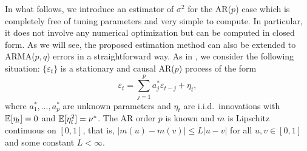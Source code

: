 In what follows, we introduce an estimator of $\sigma^2$ for the AR($p$) case which is completely free of tuning parameters and very simple to compute. In particular, it does not involve any numerical optimization but can be computed in closed form. As we will see, the proposed estimation method can also be extended to ARMA($p,q$) errors in a straightforward way. As in \cite{Hall2003}, we consider the following situation: $\{\varepsilon_t\}$ is a stationary and causal AR($p$) process of the form 
\begin{equation}\label{AR-errors} 
\varepsilon_t = \sum_{j=1}^p a_j^* \varepsilon_{t-j} + \eta_t, 
\end{equation} 
where $a_1^*,\ldots,a_p^*$ are unknown parameters and $\eta_t$ are i.i.d.\ innovations with $\mathbb{E}[\eta_t] = 0$ and $\mathbb{E}[\eta_t^2] = \nu^*$. The AR order $p$ is known and $m$ is Lipschitz continuous on $[0,1]$, that is, $|m(u) - m(v)| \le L|u-v|$ for all $u,v \in [0,1]$ and some constant $L < \infty$. 


